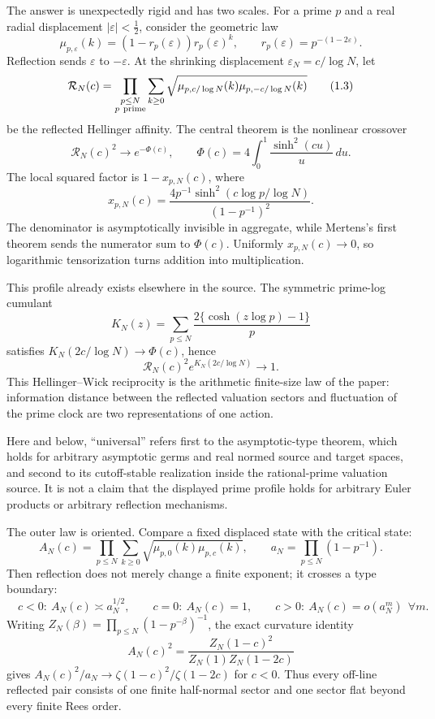 \documentclass[11pt]{article}
\theoremstyle{definition}
\theoremstyle{remark}
\begin{document}
The answer is unexpectedly rigid and has two scales.  For a prime \(p\) and a real radial
displacement \(|\varepsilon|<\tfrac12\), consider the geometric law
\[
 \mu_{p,\varepsilon}(k)=(1-r_p(\varepsilon))r_p(\varepsilon)^k,
 \qquad r_p(\varepsilon)=p^{-(1-2\varepsilon)}.
 \tag{1.2}\label{eq:valuation-law-intro}
\]
Reflection sends \(\varepsilon\) to \(-\varepsilon\).  At the shrinking displacement
\(\varepsilon_N=c/\log N\), let
\[
 \mathcal R_N(c)=\prod_{\substack{p\leq N\\p\ {\rm prime}}}
 \sum_{k\geq0}
 \sqrt{\mu_{p,c/\log N}(k)\mu_{p,-c/\log N}(k)}
 \tag{1.3}\label{eq:hellinger-intro}
\]
be the reflected Hellinger affinity.  The central theorem is the nonlinear crossover
\[
 \boxed{\quad
 \mathcal R_N(c)^2\longrightarrow e^{-\Phi(c)},\qquad
 \Phi(c)=4\int_0^1\frac{\sinh^2(cu)}u\,du .
 \quad}
 \tag{1.4}\label{eq:critical-profile-intro}
\]
The local squared factor is \(1-x_{p,N}(c)\), where
\[
 x_{p,N}(c)=
 \frac{4p^{-1}\sinh^2(c\log p/\log N)}{(1-p^{-1})^2}.
 \tag{1.5}\label{eq:local-defect-intro}
\]
The denominator is asymptotically invisible in aggregate, while Mertens's first theorem sends
the numerator sum to \(\Phi(c)\).  Uniformly \(x_{p,N}(c)\to0\), so logarithmic
tensorization turns addition into multiplication.

This profile already exists elsewhere in the source.  The symmetric prime-log cumulant
\[
 K_N(z)=\sum_{p\leq N}\frac{2\{\cosh(z\log p)-1\}}p
 \tag{1.6}\label{eq:wick-cumulant-intro}
\]
satisfies \(K_N(2c/\log N)\to\Phi(c)\), hence
\[
 \mathcal R_N(c)^2e^{K_N(2c/\log N)}\longrightarrow1.
 \tag{1.7}\label{eq:hellinger-wick-intro}
\]
This Hellinger--Wick reciprocity is the arithmetic finite-size law of the paper: information distance
between the reflected valuation sectors and fluctuation of the prime clock are two
representations of one action.

Here and below, ``universal'' refers first to the asymptotic-type theorem, which holds for
arbitrary asymptotic germs and real normed source and target spaces, and second to its cutoff-stable
realization inside the rational-prime valuation source.  It is not a claim that the displayed
prime profile holds for arbitrary Euler products or arbitrary reflection mechanisms.

The outer law is oriented.  Compare a fixed displaced state with the critical state:
\[
 A_N(c)=\prod_{p\leq N}
 \sum_{k\geq0}\sqrt{\mu_{p,0}(k)\mu_{p,c}(k)},\qquad
 a_N=\prod_{p\leq N}(1-p^{-1}).
 \tag{1.8}\label{eq:fixed-sector-intro}
\]
Then reflection does not merely change a finite exponent; it crosses a type boundary:
\[
 \boxed{\quad
 c<0:\ A_N(c)\asymp a_N^{1/2},\qquad
 c=0:\ A_N(c)=1,\qquad
 c>0:\ A_N(c)=o(a_N^m)\ \ \forall m.
 \quad}
 \tag{1.9}\label{eq:three-phase-intro}
\]
Writing \(Z_N(\beta)=\prod_{p\leq N}(1-p^{-\beta})^{-1}\), the exact curvature identity
\[
 A_N(c)^2=\frac{Z_N(1-c)^2}{Z_N(1)Z_N(1-2c)}
 \tag{1.10}\label{eq:partition-curvature-intro}
\]
gives \(A_N(c)^2/a_N\to\zeta(1-c)^2/\zeta(1-2c)\) for \(c<0\).
Thus every off-line reflected pair consists of one finite half-normal sector and one sector
flat beyond every finite Rees order.
\end{document}
